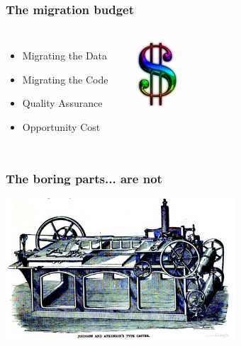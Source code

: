 \documentclass{beamer}
\begin{document}
\begin{frame}[fragile]
  \frametitle{The migration budget}
  
  \vfill

\begin{columns}

  \begin{itemize}
  \item Migrating the Data
  \item Migrating the Code
  \item Quality Assurance
  \item Opportunity Cost
  \end{itemize}  

\begin{center}
  \includegraphics[height=7em]{Dollar-sign.jpg}
\end{center}
\end{columns}
\end{frame}

\begin{frame}
  \frametitle{The boring parts... are not}

  
  \begin{center}
    \includegraphics[height=2.1in]{type-casting-machine.jpg}
  \end{center}
\end{frame}
\end{document}

